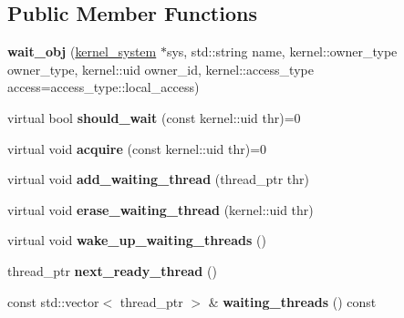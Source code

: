 \subsection*{Public Member Functions}
\begin{DoxyCompactItemize}
\item 
\mbox{\label{classeka2l1_1_1kernel_1_1wait__obj_a831297b2914dfde818fdfb18d77eca49}} 
{\bfseries wait\+\_\+obj} (\mbox{\hyperlink{classeka2l1_1_1kernel__system}{kernel\+\_\+system}} $\ast$sys, std\+::string name, kernel\+::owner\+\_\+type owner\+\_\+type, kernel\+::uid owner\+\_\+id, kernel\+::access\+\_\+type access=access\+\_\+type\+::local\+\_\+access)
\item 
\mbox{\label{classeka2l1_1_1kernel_1_1wait__obj_a741ae0a91a9e989e2a0abfcf4e0ab89a}} 
virtual bool {\bfseries should\+\_\+wait} (const kernel\+::uid thr)=0
\item 
\mbox{\label{classeka2l1_1_1kernel_1_1wait__obj_abe5c0a43297626d6b7fce6e798c22f77}} 
virtual void {\bfseries acquire} (const kernel\+::uid thr)=0
\item 
\mbox{\label{classeka2l1_1_1kernel_1_1wait__obj_aaf2ff995bde8d32bc8366d7e8e9b4b3f}} 
virtual void {\bfseries add\+\_\+waiting\+\_\+thread} (thread\+\_\+ptr thr)
\item 
\mbox{\label{classeka2l1_1_1kernel_1_1wait__obj_a4ec8fdf3bec6548f8add79f552afb1c2}} 
virtual void {\bfseries erase\+\_\+waiting\+\_\+thread} (kernel\+::uid thr)
\item 
\mbox{\label{classeka2l1_1_1kernel_1_1wait__obj_a30c96fbecba4653f9d755392f2d88023}} 
virtual void {\bfseries wake\+\_\+up\+\_\+waiting\+\_\+threads} ()
\item 
\mbox{\label{classeka2l1_1_1kernel_1_1wait__obj_aaa7e70278a662ca7d7311f2a1cd23884}} 
thread\+\_\+ptr {\bfseries next\+\_\+ready\+\_\+thread} ()
\item 
\mbox{\label{classeka2l1_1_1kernel_1_1wait__obj_a491869c68d57cf65bdcc5589d5bf6074}} 
const std\+::vector$<$ thread\+\_\+ptr $>$ \& {\bfseries waiting\+\_\+threads} () const
\end{DoxyCompactItemize}

